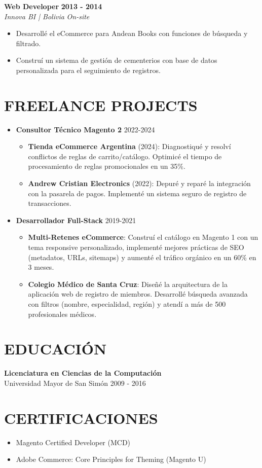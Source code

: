 \documentclass[11pt, a4paper]{article}
\newcommand{\header}[1]{\section*{\fontsize{10.5}{11}\selectfont\bfseries\color{accent}\uppercase{#1}}}
\newcommand{\jobtitle}[2]{\textbf{#1} \hfill \textbf{\small #2}} %
\newcommand{\company}[1]{\textit{#1}} %
\begin{document}
\jobtitle{Web Developer}{2013 - 2014} \\
\company{Innova BI | Bolivia} \hfill \textit{On-site}
\begin{itemize}[noitemsep, topsep=3pt]
	\item Desarrollé el eCommerce para Andean Books con funciones de búsqueda y filtrado.
	\item Construí un sistema de gestión de cementerios con base de datos personalizada para el seguimiento de registros.
\end{itemize}

\header{Freelance Projects}
\begin{itemize}[noitemsep, topsep=3pt]
	\item \textbf{Consultor Técnico Magento 2} \hfill 2022-2024
	\begin{itemize}[noitemsep, topsep=3pt]
		\item \textbf{Tienda eCommerce Argentina} (2024): Diagnostiqué y resolví conflictos de reglas de carrito/catálogo. Optimicé el tiempo de procesamiento de reglas promocionales en un 35\%.
		
		\item \textbf{Andrew Cristian Electronics} (2022): Depuré y reparé la integración con la pasarela de pagos. Implementé un sistema seguro de registro de transacciones.
	\end{itemize}
	
	\item \textbf{Desarrollador Full-Stack} \hfill 2019-2021
	\begin{itemize}[noitemsep, topsep=3pt]
		\item \textbf{Multi-Retenes eCommerce}: Construí el catálogo en Magento 1 con un tema responsive personalizado, implementé mejores prácticas de SEO (metadatos, URLs, sitemaps) y aumenté el tráfico orgánico en un 60\% en 3 meses.
		
		\item \textbf{Colegio Médico de Santa Cruz}: Diseñé la arquitectura de la aplicación web de registro de miembros. Desarrollé búsqueda avanzada con filtros (nombre, especialidad, región) y atendí a más de 500 profesionales médicos.
	\end{itemize}
\end{itemize}


\header{Educación}
\textbf{Licenciatura en Ciencias de la Computación} \\
Universidad Mayor de San Simón \hfill 2009 - 2016

\header{Certificaciones}
\begin{itemize}[noitemsep, topsep=3pt]
    \item Magento Certified Developer (MCD)
    \item Adobe Commerce: Core Principles for Theming (Magento U)
\end{itemize}
\end{document}
